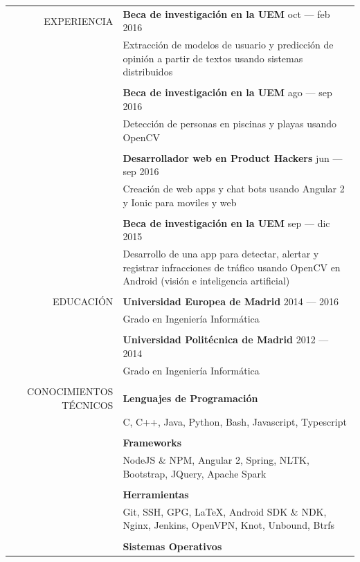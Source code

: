 \documentclass[a4paper, 11pt]{article}
\begin{document}
    \begin{longtable}{rp{11cm}}
        EXPERIENCIA
        & {\bf Beca de investigación en la UEM} \hfill oct --- feb 2016\\
        & Extracción de modelos de usuario y predicción de opinión a partir de textos usando sistemas distribuidos\\\\
        & {\bf Beca de investigación en la UEM} \hfill ago --- sep 2016\\
        & Detección de personas en piscinas y playas usando OpenCV\\\\
        & {\bf Desarrollador web en Product Hackers} \hfill jun --- sep 2016\\
        & Creación de web apps y chat bots usando Angular 2 y Ionic para moviles y web\\\\
        & {\bf Beca de investigación en la UEM} \hfill sep --- dic 2015\\
        & Desarrollo de una app para detectar, alertar y registrar infracciones de tráfico usando OpenCV en Android (visión e inteligencia artificial)\\
        \\
        EDUCACIÓN
        & {\bf Universidad Europea de Madrid} \hfill 2014 --- 2016\\
        & Grado en Ingeniería Informática\\\\
        & {\bf Universidad Politécnica de Madrid} \hfill 2012 --- 2014\\
        & Grado en Ingeniería Informática\\\\
        CONOCIMIENTOS TÉCNICOS
        & {\bf Lenguajes de Programación}\\
        & C, C++, Java, Python, Bash, Javascript, Typescript\\\\
        & {\bf Frameworks}\\
        & NodeJS \& NPM, Angular 2, Spring, NLTK, Bootstrap, JQuery, Apache Spark\\\\
        & {\bf Herramientas}\\
        & Git, SSH, GPG, \LaTeX, Android SDK \& NDK, Nginx, Jenkins, OpenVPN, Knot, Unbound, Btrfs\\\\
        & {\bf Sistemas Operativos}\\

\end{longtable}
\end{document}
